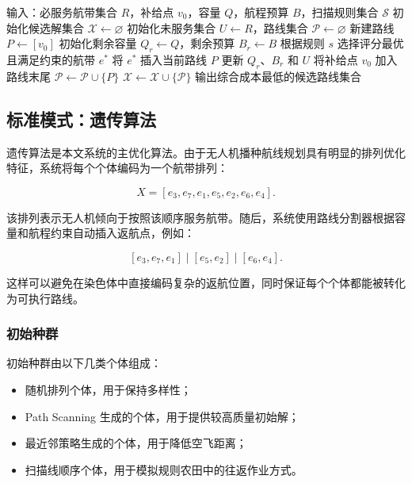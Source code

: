 \documentclass[UTF8,a4paper,12pt]{ctexart}
\begin{document}
\begin{algorithm}[H]
\caption{Path Scanning 快速构造算法}
\begin{algorithmic}[1]
\State 输入：必服务航带集合 \(R\)，补给点 \(v_0\)，容量 \(Q\)，航程预算 \(B\)，扫描规则集合 \(\mathcal{S}\)
\State 初始化候选解集合 \(\mathcal{X}\gets \varnothing\)
\State 初始化未服务集合 \(U \gets R\)，路线集合 \(\mathcal{P}\gets \varnothing\)
    \State 新建路线 \(P\gets [v_0]\)
    \State 初始化剩余容量 \(Q_r\gets Q\)，剩余预算 \(B_r\gets B\)
        \State 根据规则 \(s\) 选择评分最优且满足约束的航带 \(e^\ast\)
        \State 将 \(e^\ast\) 插入当前路线 \(P\)
        \State 更新 \(Q_r\)、\(B_r\) 和 \(U\)
    \EndWhile
    \State 将补给点 \(v_0\) 加入路线末尾
    \State \(\mathcal{P}\gets \mathcal{P}\cup\{P\}\)
\EndWhile
\State \(\mathcal{X}\gets \mathcal{X}\cup\{\mathcal{P}\}\)
\EndFor
\State 输出综合成本最低的候选路线集合
\end{algorithmic}
\end{algorithm}

\subsection{标准模式：遗传算法}

遗传算法是本文系统的主优化算法。由于无人机播种航线规划具有明显的排列优化特征，系统将每个个体编码为一个航带排列：

\[
X=[e_3,e_7,e_1,e_5,e_2,e_6,e_4].
\]

该排列表示无人机倾向于按照该顺序服务航带。随后，系统使用路线分割器根据容量和航程约束自动插入返航点，例如：

\[
[e_3,e_7,e_1]\mid[e_5,e_2]\mid[e_6,e_4].
\]

这样可以避免在染色体中直接编码复杂的返航位置，同时保证每个个体都能被转化为可执行路线。

\subsubsection{初始种群}

初始种群由以下几类个体组成：

\begin{itemize}
    \item 随机排列个体，用于保持多样性；
    \item Path Scanning 生成的个体，用于提供较高质量初始解；
    \item 最近邻策略生成的个体，用于降低空飞距离；
    \item 扫描线顺序个体，用于模拟规则农田中的往返作业方式。
\end{itemize}
\end{document}
